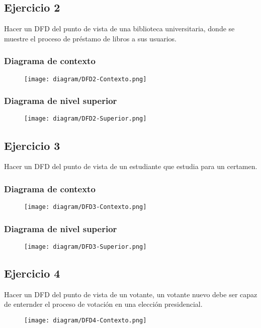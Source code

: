 \documentclass{templateNote}
\begin{document}
\newpage
\subsection{Ejercicio 2}
Hacer un DFD del punto de vista de una biblioteca universitaria, donde se muestre el proceso de préstamo de libros a sus usuarios.
\subsubsection{Diagrama de contexto}
\begin{figure}[H]
    \centering
    \texttt{[image: diagram/DFD2-Contexto.png]}
\end{figure}

\subsubsection{Diagrama de nivel superior}
\begin{figure}[H]
    \centering
    \texttt{[image: diagram/DFD2-Superior.png]}
\end{figure}

\newpage
\subsection{Ejercicio 3}
Hacer un DFD del punto de vista de un estudiante que estudia para un certamen.
\subsubsection{Diagrama de contexto}
\begin{figure}[H]
    \centering
    \texttt{[image: diagram/DFD3-Contexto.png]}
\end{figure}

\subsubsection{Diagrama de nivel superior}
\begin{figure}[H]
    \centering
    \texttt{[image: diagram/DFD3-Superior.png]}
\end{figure}

\newpage
\subsection{Ejercicio 4}
Hacer un DFD del punto de vista de un votante, un votante nuevo debe ser capaz de enternder el proceso de votación en una elección presidencial.
\begin{figure}[H]
    \centering
    \texttt{[image: diagram/DFD4-Contexto.png]}
\end{figure}
\end{document}
